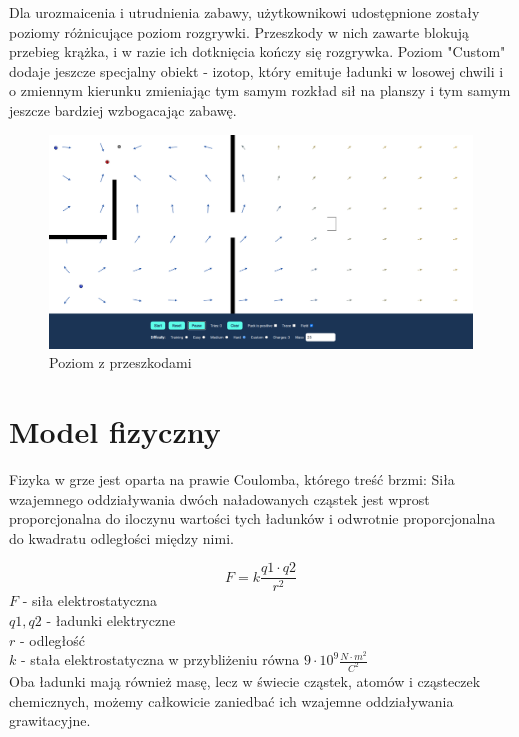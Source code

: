 \documentclass{article}
\begin{document}
Dla urozmaicenia i utrudnienia zabawy, użytkownikowi udostępnione zostały poziomy różnicujące poziom rozgrywki. Przeszkody w nich zawarte blokują przebieg krążka, i w razie ich dotknięcia kończy się rozgrywka. Poziom "Custom" dodaje jeszcze specjalny obiekt - izotop, który emituje ładunki w losowej chwili i o zmiennym kierunku zmieniając tym samym rozkład sił na planszy i tym samym jeszcze bardziej wzbogacając zabawę. 

\begin{figure}[H]
    \centering
    \includegraphics[width=\textwidth,height=\textheight,keepaspectratio]{img/level.png}
    \caption{Poziom z przeszkodami}
    \label{fig:vector_drawing}
\end{figure}


\section{Model fizyczny}
Fizyka w grze jest oparta na prawie Coulomba, którego treść brzmi: Siła wzajemnego oddziaływania dwóch naładowanych cząstek jest wprost proporcjonalna do iloczynu wartości tych ładunków i odwrotnie proporcjonalna do kwadratu odległości między nimi.


$$F=k \frac{q 1 \cdot q 2}{r^{2}}$$
$F$ - siła elektrostatyczna \\
$q1, q2$ - ładunki elektryczne \\
$r$ - odległość \\
$k$ - stała elektrostatyczna w przybliżeniu równa $9 \cdot 10^9 \frac{N \cdot m^2}{C^2}$
\\

\noindent Oba ładunki mają również masę, lecz w świecie cząstek, atomów i cząsteczek chemicznych, możemy całkowicie zaniedbać ich wzajemne oddziaływania grawitacyjne.
\end{document}
